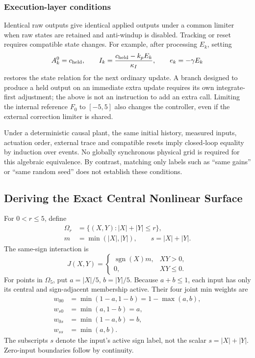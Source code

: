 \subsubsection{Execution-layer conditions}
Identical raw outputs give identical applied outputs under a common
limiter when raw states are retained and anti-windup is disabled.
Tracking or reset requires compatible state changes. For example, after
processing $E_k$, setting
\[
 A^0_k=c_{\rm held},\qquad
 I_k=\frac{c_{\rm held}-k_pE_k}{\kappa_I},\qquad
 e_k=-\gamma E_k
\]
restores the state relation for the next ordinary update. A branch designed
to produce a held output on an immediate extra update requires its own
integrate-first adjustment; the above is not an instruction to add an
extra call. Limiting the internal reference $F_0$ to $[-5,5]$ also changes
the controller, even if the external correction limiter is shared.

Under a deterministic causal plant, the same initial history, measured
inputs, actuation order, external trace and compatible resets imply
closed-loop equality by induction over events. No globally synchronous
physical grid is required for this algebraic equivalence. By contrast,
matching only labels such as ``same gains'' or ``same random seed'' does
not establish these conditions.

\subsection{Deriving the Exact Central Nonlinear Surface}
\label{detail:subsec:fpi_mechanism}

For $0<r\le5$, define
\begin{align}
 \Omega_r&=\{(X,Y):|X|+|Y|\le r\},\nonumber\\
 m&=\min(|X|,|Y|),\qquad s=|X|+|Y|.
 \label{detail:eq:fpi_domain}
\end{align}
The same-sign interaction is
\begin{equation}
 J(X,Y)=\begin{cases}\operatorname{sgn}(X)m,&XY>0,\\0,&XY\le0.\end{cases}
 \label{detail:eq:fpi_interaction}
\end{equation}
For points in $\Omega_5$, put $a=|X|/5$, $b=|Y|/5$.
Because $a+b\le1$, each input has only its central and sign-adjacent
membership active. Their four joint min weights are
\begin{align}
 w_{00}&=\min(1-a,1-b)=1-\max(a,b),\nonumber\\
 w_{s0}&=\min(a,1-b)=a,\nonumber\\
 w_{0s}&=\min(1-a,b)=b,\nonumber\\
 w_{ss}&=\min(a,b).
 \label{detail:eq:fpd_four_weights}
\end{align}
The subscripts $s$ denote the input's active sign label, not the scalar
$s=|X|+|Y|$. Zero-input boundaries follow by continuity.

